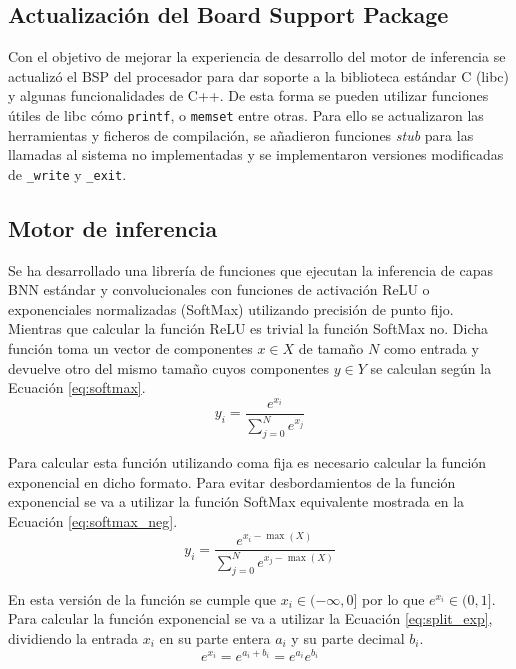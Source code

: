 \subsection{Actualización del Board Support Package}

Con el objetivo de mejorar la experiencia de desarrollo del motor de inferencia se actualizó el BSP del procesador para dar soporte a la biblioteca estándar C (libc) y algunas funcionalidades de C++. De esta forma se pueden utilizar funciones útiles de libc cómo \texttt{printf}, o \texttt{memset} entre otras. Para ello se actualizaron las herramientas y ficheros de compilación, se añadieron funciones \textit{stub} para las llamadas al sistema no implementadas y se implementaron versiones modificadas de \texttt{\_write} y \texttt{\_exit}.

\subsection{Motor de inferencia} \label{sec:motor_inferencia_c}

Se ha desarrollado una librería de funciones que ejecutan la inferencia de capas BNN estándar y convolucionales con funciones de activación ReLU o exponenciales normalizadas (SoftMax) utilizando precisión de punto fijo. Mientras que calcular la función ReLU es trivial la función SoftMax no. Dicha función toma un vector de componentes $x \in X$ de tamaño $N$ como entrada y devuelve otro del mismo tamaño cuyos componentes $y\in Y$ se calculan según la Ecuación \ref{eq:softmax}.
\begin{equation} \label{eq:softmax}
y_i = \dfrac{e^{x_i}}{\sum_{j = 0}^N e^{x_j}}
\end{equation}

Para calcular esta función utilizando coma fija es necesario calcular la función exponencial en dicho formato. Para evitar desbordamientos de la función exponencial se va a utilizar la función SoftMax equivalente mostrada en la Ecuación \ref{eq:softmax_neg}.
\begin{equation} \label{eq:softmax_neg}
y_i = \dfrac{e^{x_i - \max(X)}}{\sum_{j = 0}^N e^{x_j - \max(X)}}
\end{equation}

En esta versión de la función se cumple que $x_i \in (-\infty, 0]$ por lo que $e^{x_i} \in (0,1]$. Para calcular la función exponencial se va a utilizar la Ecuación \ref{eq:split_exp}, dividiendo la entrada $x_i$ en su parte entera $a_i$ y su parte decimal $b_i$.
\begin{equation} \label{eq:split_exp}
e^{x_i} = e^{a_i+b_i} = e^{a_i} e^{b_i}
\end{equation}

